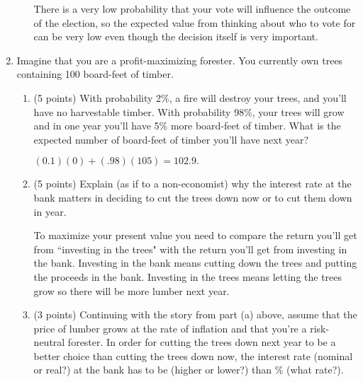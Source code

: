 \documentclass[twoside]{article}
\begin{document}
\begin{enumerate}
\begin{enumerate}
\begin{KEY}
There is a very low probability that your vote will influence the outcome of the election, so the expected value from thinking about who to vote for can be very low even though the decision itself is very important.
\end{KEY}

    \end{enumerate}




\item \begin{EXAM} Imagine that you are a profit-maximizing forester. You currently own trees containing 100 board-feet of timber. \end{EXAM}

    \begin{enumerate}

    \item \begin{EXAM} (5 points) With probability 2\%, a fire will destroy your trees, and you'll have no harvestable timber. With probability 98\%, your trees will grow and in one year you'll have 5\% more board-feet of timber. What is the expected number of board-feet of timber you'll have next year?  \end{EXAM}

\begin{KEY}
$(0.1)(0) + (.98)(105) = 102.9.$
\end{KEY}


    \item \begin{EXAM} (5 points) Explain (as if to a non-economist) why the interest rate at the bank matters in deciding to cut the trees down now or to cut them down in year. \end{EXAM}

\begin{KEY}
To maximize your present value you need to compare the return you'll get from ``investing in the trees" with the return you'll get from investing in the bank. Investing in the bank means cutting down the trees and putting the proceeds in the bank. Investing in the trees means letting the trees grow so there will be more lumber next year.
\end{KEY}

    \item \begin{EXAM} (3 points) Continuing with the story from part (a) above, assume that the price of lumber grows at the rate of inflation and that you're a risk-neutral forester. In order for cutting the trees down next year to be a better choice than cutting the trees down now, the \underline{\hspace{1in}} interest rate (nominal or real?) at the bank has to be \underline{\hspace{1in}} (higher  or lower?) than \underline{\hspace{1in}}\% (what rate?).  \end{EXAM}


\end{enumerate}
\end{enumerate}
\end{document}
